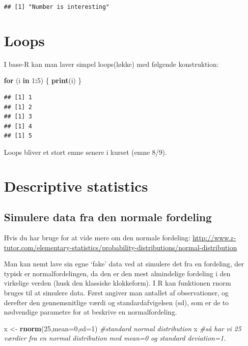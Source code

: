 \documentclass[
]{book}
\newenvironment{Shaded}{\begin{snugshade}}{\end{snugshade}}
\newcommand{\AttributeTok}[1]{\textcolor[rgb]{0.13,0.29,0.53}{#1}}
\newcommand{\CommentTok}[1]{\textcolor[rgb]{0.56,0.35,0.01}{\textit{#1}}}
\newcommand{\ControlFlowTok}[1]{\textcolor[rgb]{0.13,0.29,0.53}{\textbf{#1}}}
\newcommand{\DecValTok}[1]{\textcolor[rgb]{0.00,0.00,0.81}{#1}}
\newcommand{\FunctionTok}[1]{\textcolor[rgb]{0.13,0.29,0.53}{\textbf{#1}}}
\newcommand{\NormalTok}[1]{#1}
\newcommand{\OtherTok}[1]{\textcolor[rgb]{0.56,0.35,0.01}{#1}}
\newcommand{\SpecialCharTok}[1]{\textcolor[rgb]{0.81,0.36,0.00}{\textbf{#1}}}
\theoremstyle{definition}
\theoremstyle{definition}
\theoremstyle{definition}
\theoremstyle{definition}
\theoremstyle{remark}
\begin{document}
\begin{verbatim}
## [1] "Number is interesting"
\end{verbatim}

\section{Loops}\label{loops}

I base-R kan man laver simpel loops(løkke) med følgende konstruktion:

\begin{Shaded}
\begin{Highlighting}[]
\ControlFlowTok{for}\NormalTok{ (i }\ControlFlowTok{in} \DecValTok{1}\SpecialCharTok{:}\DecValTok{5}\NormalTok{) \{}
  \FunctionTok{print}\NormalTok{(i)}
\NormalTok{\}}
\end{Highlighting}
\end{Shaded}

\begin{verbatim}
## [1] 1
## [1] 2
## [1] 3
## [1] 4
## [1] 5
\end{verbatim}

Loops bliver et stort emne senere i kurset (emne 8/9).

\section{Descriptive statistics}\label{descriptive-statistics}

\subsection{Simulere data fra den normale fordeling}\label{simulere-data-fra-den-normale-fordeling}

Hvis du har bruge for at vide mere om den normale fordeling: \url{http://www.r-tutor.com/elementary-statistics/probability-distributions/normal-distribution}

Man kan nemt lave sin egne `fake' data ved at simulere det fra en fordeling, der typisk er normalfordelingen, da den er den mest almindelige fordeling i den virkelige verden (husk den klassiske klokkeform). I R kan funktionen rnorm bruges til at simulere data. Først angiver man antallet af observationer, og derefter den gennemsnitlige værdi og standardafvigelsen (sd), som er de to nødvendige parametre for at beskrive en normalfordeling.

\begin{Shaded}
\begin{Highlighting}[]
\NormalTok{x }\OtherTok{\textless{}{-}} \FunctionTok{rnorm}\NormalTok{(}\DecValTok{25}\NormalTok{,}\AttributeTok{mean=}\DecValTok{0}\NormalTok{,}\AttributeTok{sd=}\DecValTok{1}\NormalTok{) }\CommentTok{\#standard normal distribution}
\NormalTok{x }\CommentTok{\#så har vi 25 værdier fra en normal distribution med mean=0 og standard deviation=1.}
\end{Highlighting}
\end{Shaded}
\end{document}
